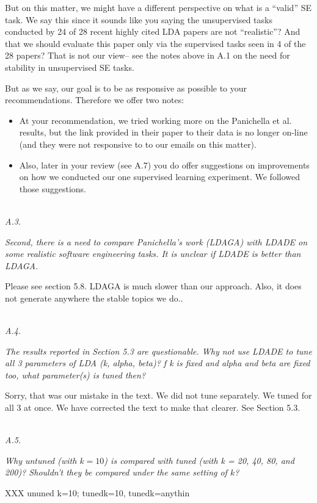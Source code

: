 \documentclass[conference]{IEEEtran}
\newcommand{\bi}{\begin{itemize}}
\newcommand{\ei}{\end{itemize}}
\begin{document}
But on this matter, we might have a different perspective on what is a ``valid'' SE task.
We say this since it
sounds like you saying the unsupervised
tasks conducted by   24 of 28 recent highly cited LDA papers are not ``realistic''? And that we should
evaluate this paper only via the supervised tasks seen in 4 of the 28 papers?
That is not our view-- see the notes above in A.1 on the need for stability in unsupervised SE tasks.

But as we say, our goal is to be as responsive as possible to your recommendations. Therefore we offer two notes:
\bi
\item
At your recommendation, we tried working more on the  Panichella et al. results, but the link provided in their paper to their data
is no longer on-line (and they were not responsive to to our emails on this matter).
\item
Also, later in your review (see A.7) you do offer suggestions on improvements on how we conducted our one supervised learning
experiment.  We followed those suggestions.
\ei

\noindent
\textit{\\A.3.} 

\textit{Second, there is a need to compare Panichella's work (LDAGA) with LDADE on some realistic software engineering tasks. It is unclear if LDADE is better than LDAGA.\\}

Please see section 5.8. LDAGA is much slower than our approach. Also, it does not generate anywhere the stable topics we do..

\noindent
\textit{\\A.4.}

\textit{The results reported in Section 5.3 are questionable. Why not use LDADE to tune all 3 parameters of LDA (k, alpha, beta)? f k is fixed and alpha and beta are fixed too, what parameter(s) is tuned then?\\}

 Sorry, that was our mistake in the text. We did not tune separately. We tuned for all 3 at once. We have corrected the text to make that clearer. See Section 5.3.

\noindent
\textit{\\A.5.}  

\textit{Why untuned (with $k = 10$) is compared with tuned (with k = 20, 40, 80, and 200)? Shouldn't they be compared under the same setting of $k$? \\}

XXX ununed k=10; tunedk=10, tunedk=anythin
\end{document}
